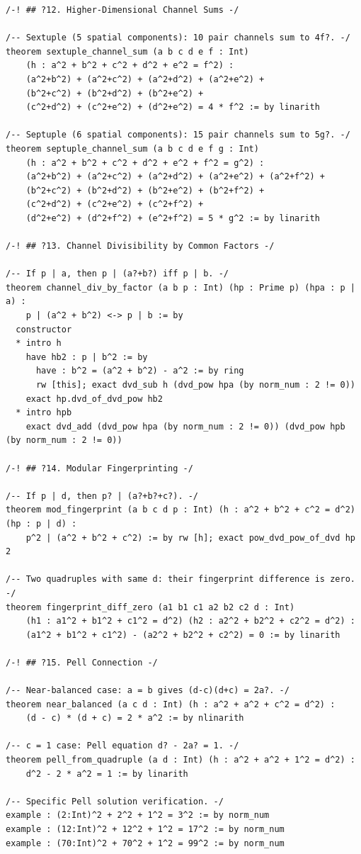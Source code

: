 \documentclass[11pt,twoside,openright]{book}
\theoremstyle{definition}
\theoremstyle{remark}
\begin{document}
\begin{lstlisting}[style=lean]
/-! ## ?12. Higher-Dimensional Channel Sums -/

/-- Sextuple (5 spatial components): 10 pair channels sum to 4f?. -/
theorem sextuple_channel_sum (a b c d e f : Int)
    (h : a^2 + b^2 + c^2 + d^2 + e^2 = f^2) :
    (a^2+b^2) + (a^2+c^2) + (a^2+d^2) + (a^2+e^2) +
    (b^2+c^2) + (b^2+d^2) + (b^2+e^2) +
    (c^2+d^2) + (c^2+e^2) + (d^2+e^2) = 4 * f^2 := by linarith

/-- Septuple (6 spatial components): 15 pair channels sum to 5g?. -/
theorem septuple_channel_sum (a b c d e f g : Int)
    (h : a^2 + b^2 + c^2 + d^2 + e^2 + f^2 = g^2) :
    (a^2+b^2) + (a^2+c^2) + (a^2+d^2) + (a^2+e^2) + (a^2+f^2) +
    (b^2+c^2) + (b^2+d^2) + (b^2+e^2) + (b^2+f^2) +
    (c^2+d^2) + (c^2+e^2) + (c^2+f^2) +
    (d^2+e^2) + (d^2+f^2) + (e^2+f^2) = 5 * g^2 := by linarith

/-! ## ?13. Channel Divisibility by Common Factors -/

/-- If p | a, then p | (a?+b?) iff p | b. -/
theorem channel_div_by_factor (a b p : Int) (hp : Prime p) (hpa : p | a) :
    p | (a^2 + b^2) <-> p | b := by
  constructor
  * intro h
    have hb2 : p | b^2 := by
      have : b^2 = (a^2 + b^2) - a^2 := by ring
      rw [this]; exact dvd_sub h (dvd_pow hpa (by norm_num : 2 != 0))
    exact hp.dvd_of_dvd_pow hb2
  * intro hpb
    exact dvd_add (dvd_pow hpa (by norm_num : 2 != 0)) (dvd_pow hpb (by norm_num : 2 != 0))

/-! ## ?14. Modular Fingerprinting -/

/-- If p | d, then p? | (a?+b?+c?). -/
theorem mod_fingerprint (a b c d p : Int) (h : a^2 + b^2 + c^2 = d^2) (hp : p | d) :
    p^2 | (a^2 + b^2 + c^2) := by rw [h]; exact pow_dvd_pow_of_dvd hp 2

/-- Two quadruples with same d: their fingerprint difference is zero. -/
theorem fingerprint_diff_zero (a1 b1 c1 a2 b2 c2 d : Int)
    (h1 : a1^2 + b1^2 + c1^2 = d^2) (h2 : a2^2 + b2^2 + c2^2 = d^2) :
    (a1^2 + b1^2 + c1^2) - (a2^2 + b2^2 + c2^2) = 0 := by linarith

/-! ## ?15. Pell Connection -/

/-- Near-balanced case: a = b gives (d-c)(d+c) = 2a?. -/
theorem near_balanced (a c d : Int) (h : a^2 + a^2 + c^2 = d^2) :
    (d - c) * (d + c) = 2 * a^2 := by nlinarith

/-- c = 1 case: Pell equation d? - 2a? = 1. -/
theorem pell_from_quadruple (a d : Int) (h : a^2 + a^2 + 1^2 = d^2) :
    d^2 - 2 * a^2 = 1 := by linarith

/-- Specific Pell solution verification. -/
example : (2:Int)^2 + 2^2 + 1^2 = 3^2 := by norm_num
example : (12:Int)^2 + 12^2 + 1^2 = 17^2 := by norm_num
example : (70:Int)^2 + 70^2 + 1^2 = 99^2 := by norm_num


\end{lstlisting}
\end{document}
